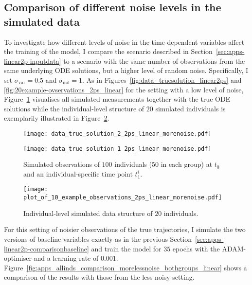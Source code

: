 \subsection{Comparison of different noise levels in the simulated data}\label{sec:apps-linear2p-comparisonnoise}

To investigate how different levels of noise in the time-dependent variables affect the training of the model, I compare the scenario described in Section~\ref{sec:apps-linear2p-inputdata} to a scenario with the same number of observations from the same underlying ODE solutions, but a higher level of random noise. Specifically, I set $\sigma_{\mathrm{var}} = 0.5$ and $\sigma_{\mathrm{ind}} = 1$. As in Figures~\ref{fig:data_truesolution_linear2ps} and \ref{fig:20example-ovservations_2ps_linear} for the setting with a low level of noise, Figure~\ref{fig:data_truesolution_linear2ps_morenoise} visualises all simulated measurements together with the true ODE solutions while the individual-level structure of $20$ simulated individuals is exemplarily illustrated in Figure~\ref{fig:20example-ovservations_2ps_linear_morenoise}.
\begin{figure}
	\centering
	\begin{minipage}{.5\linewidth}
		\centering
		\texttt{[image: data\_true\_solution\_2\_2ps\_linear\_morenoise.pdf]}
	\end{minipage}\begin{minipage}{.5\linewidth}
		\centering
		\texttt{[image: data\_true\_solution\_1\_2ps\_linear\_morenoise.pdf]}
	\end{minipage}
	\caption{Simulated observations of $100$ individuals ($50$ in each group) at $t_0$ and an individual-specific time point $t_1^i$.}
	\label{fig:data_truesolution_linear2ps_morenoise}
\end{figure}
\begin{figure}
	\texttt{[image: plot\_of\_10\_example\_observations\_2ps\_linear\_morenoise.pdf]}
	\caption{Individual-level simulated data structure of $20$ individuals.}
	\label{fig:20example-ovservations_2ps_linear_morenoise}
\end{figure}
For this setting of noisier observations of the true trajectories, I simulate the two versions of baseline variables exactly as in the previous Section~\ref{sec:apps-linear2p-comparisonbaseline} and train the model for $35$ epochs with the ADAM-optimiser and a learning rate of $0.001$.
Figure~\ref{fig:apps_allinds_comparison_morelessnoise_bothgroups_linear} shows a comparison of the results with those from the less noisy setting.
